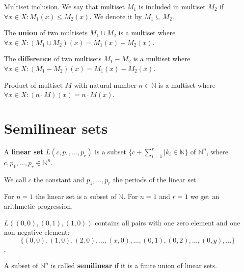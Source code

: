 \begin{definition}
Multiset inclusion. We say that multiset $M_1$ is included in multiset $M_2$ if $\forall x \in X: M_1(x)\leq M_2(x)$. We denote it by $M_1\subseteq M_2$.
\end{definition}

\begin{definition}
The {\bf union} of two multisets $M_1\cup M_2$ is a multiset where $\forall x \in X: (M_1\cup M_2)(x)=M_1(x)+M_2(x)$.
\end{definition}

\begin{definition}
The {\bf difference} of two multisets $M_1-M_2$ is a multiset where $\forall x \in X: (M_1-M_2)(x)=M_1(x)-M_2(x)$.
\end{definition}

\begin{definition}
Product of multiset $M$ with natural number $n\in \mathbb N$ is a multiset where $\forall x \in X: (n\cdot M)(x)=n\cdot M(x)$.  
\end{definition}


\section{Semilinear sets} %
\label{sec:semilinear_sets}

\begin{definition}
  A {\bf linear set} $L(c,p_1,\ldots,p_r)$ is a subset $\{c+\sum\limits_{i=1}^r|k_i\in\mathbb N\}$ of $\mathbb N^n$, where $c,p_1,\ldots,p_r\in \mathbb N^n$.
\end{definition}

We call $c$ the constant and $p_1,\ldots,p_r$ the periods of the linear set.

\begin{example}
  For $n=1$ the linear set is a subset of $\mathbb N$. For $n=1$ and $r=1$ we get an arithmetic progression.
\end{example}

\begin{example}
  $L((0,0),(0,1),(1,0))$ contains all pairs with one zero element and one non-negative element: $$\{(0,0), (1,0), (2,0), \ldots, (x,0), \ldots, (0,1), (0,2), \ldots, (0,y), \ldots\}$$.
\end{example}

\begin{definition}
  A subset of $\mathbb N^n$ is called {\bf semilinear} if it is a finite union of linear sets.
\end{definition}

